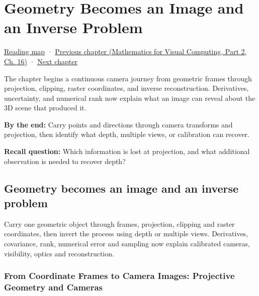 \chapter{Geometry Becomes an Image and an Inverse Problem}\label{02-foundations-ii-ch032-geometry-becomes-an-image-and-an-inverse-problem}\hypertarget{02-foundations-ii-ch032}{}\label{stagechapter:02-foundations-ii-ch032}

\hypertarget{02-foundations-ii-ch032-geometry-becomes-an-image-and-an-inverse-problem}{}

\hyperref[volume-reading-map]{Reading map} · \href{../02-Mathematics-for-Visual-Computing-P02/main.pdf\#nameddest=03-visual-computing-i-ch012}{Previous chapter (Mathematics for Visual Computing, Part 2, Ch. 16)} · \hyperref[02-foundations-ii-ch033-projection-clipping-and-raster-sampling]{Next chapter}

The chapter begins a continuous camera journey from geometric frames through projection, clipping, raster coordinates, and inverse reconstruction. Derivatives, uncertainty, and numerical rank now explain what an image can reveal about the 3D scene that produced it.

\textbf{By the end:} Carry points and directions through camera transforms and projection, then identify what depth, multiple views, or calibration can recover.

\textbf{Recall question:} Which information is lost at projection, and what additional observation is needed to recover depth?

\section{Geometry becomes an image and an inverse problem}\label{02-foundations-ii-ch032-geometry-becomes-an-image-and-an-inverse-problem-1}

\hypertarget{02-foundations-ii-ch032-geometry-becomes-an-image-and-an-inverse-problem-1}{}

Carry one geometric object through frames, projection, clipping and raster coordinates, then invert the process using depth or multiple views. Derivatives, covariance, rank, numerical error and sampling now explain calibrated cameras, visibility, optics and reconstruction.

\subsection{From Coordinate Frames to Camera Images: Projective Geometry and Cameras}\label{02-foundations-ii-ch032-from-coordinate-frames-to-camera-images-projective-geometry-and-cameras}


